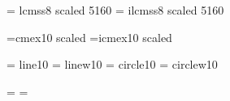 \font\fortyonerm  = lcmss8  scaled 5160 %
\font\ifortyonerm = ilcmss8 scaled 5160 %

\font\tenex =cmex10  scaled
\font\itenex=icmex10 scaled

\font\tenln    = line10
\font\tenlnw   = linew10
\font\tencirc  = circle10
\font\tencircw = circlew10

\ifnum{}\tenln=\tencirc \else 
  \fi
\ifnum{}\tenlnw=\tencircw \else 
  \fi


\lineskip 1pt
\normallineskip 1pt

\def\@subfam#1#2{\@warning{No \string#1\space typeface in 
        SLiTeX, using \string#2}#2}


\def\rm{\protect\prm}
\def\it{\protect\pit}
\def\bf{\protect\pbf}
\def\tt{\protect\ptt}
\def\sl{\@subfam\sl\it}
\def\sf{\@subfam\sf\rm}
\def\sc{\@subfam\sc\rm}

\def\em{\protect\pem{}}
\def\pem{\ifdim \fontdimen\@ne\font >\z@ \rm \else \it \fi}

\def\mit{\fam\@ne} 
\def\cal{\fam\tw@}

\def\boldmath{\@warning{No \string\boldmath\space in SLiTeX}}
\let\unboldmath=\relax

\def\@nomath#1{\ifmmode \@warning{\string#1\space in math mode.}\fi}


%
\newfam\itfam      %
\newfam\slfam      %
\newfam\bffam      %
\newfam\ttfam      %
\newfam\sffam      %
\newfam\scfam      %
\newfam\lyfam      %


\def\fourteenpt{\def\prm{\fam\z@\fourteenrm\def\@currfont{\rm}}%
\textfont\z@\fourteenrm \scriptfont\z@\fourteenrm 
  \scriptscriptfont\z@\fourteenrm
\textfont\@ne\fourteeni \scriptfont\@ne\fourteeni 
  \scriptscriptfont\@ne\fourteeni
\textfont\tw@\fourteensy \scriptfont\tw@\fourteensy 
  \scriptscriptfont\tw@\fourteensy
\textfont\thr@@\tenex \scriptfont\thr@@\tenex \scriptscriptfont\thr@@\tenex
\def\pit{\fam\itfam\fourteenit\def\@currfont{\it}}\textfont\itfam\fourteenit 
    \scriptfont\itfam\fourteenit \scriptscriptfont\itfam\fourteenit
\def\pbf{\fam\bffam\fourteenbf\def\@currfont{\bf}}\textfont\bffam\fourteenbf 
   \scriptfont\bffam\fourteenbf \scriptscriptfont\bffam\fourteenbf
\def\ptt{\fam\ttfam\fourteentt\def\@currfont{\tt}}\textfont\ttfam\fourteentt 
    \scriptfont\ttfam\fourteentt \scriptscriptfont\ttfam\fourteentt
\def\lasy{\fam\lyfam\fourteenlasy\def\@currfont{\lasy}}%
\textfont\lyfam\fourteenlasy \scriptfont\lyfam\fourteenlasy 
   \scriptscriptfont\lyfam\fourteenlasy}

